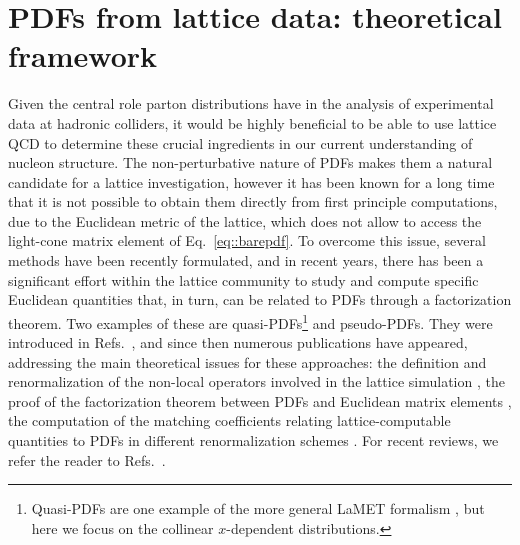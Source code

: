 \chapter{PDFs from lattice data: theoretical framework}
\label{ch:scalar_model}
 
Given the central role parton distributions have in the analysis
of experimental data at hadronic colliders, it would be highly beneficial to be
able to use lattice QCD to determine these crucial ingredients in our current
understanding of nucleon structure.
The non-perturbative nature of PDFs makes them a natural candidate for a lattice investigation,
however it has been known for a long time that it is not possible to
obtain them directly from first principle computations, due to the Euclidean metric of the
lattice, which does not allow to access the light-cone matrix element of Eq.~\eqref{eq::barepdf}.
To overcome this issue, several methods have been recently formulated, 
and in recent years, there has been a significant effort within the lattice
community to study and compute specific Euclidean quantities that, in turn, can be related to PDFs
through a factorization theorem.
%
Two examples of these are quasi-PDFs\footnote{Quasi-PDFs are one example of the more general LaMET formalism \cite{Ji:2014gla,Ji:2020ect}, 
but here we focus on the collinear $x$-dependent distributions.} and pseudo-PDFs.
They were introduced in
Refs.~\cite{PhysRevLett.110.262002, Radyushkin:2017cyf}, and since then numerous
publications have appeared, addressing the main theoretical issues for these
approaches: the definition and renormalization of
the non-local operators involved in the lattice simulation
\cite{Ji:2015jwa,Ishikawa:2016znu,Constantinou:2017sej,Alexandrou:2017huk,Ji:2017rah,Ji:2017oey,Ishikawa:2017faj,Green:2017xeu,Radyushkin:2018nbf,Zhang:2018diq,Li:2018tpe}, 
the proof of the factorization theorem between PDFs and Euclidean matrix elements
\cite{Xiong:2013bka,Ji:2014gla,Ma:2014jla,Briceno:2017cpo,Ma:2017pxb,Izubuchi:2018srq}, the computation of the
matching coefficients relating lattice-computable quantities to PDFs in different renormalization schemes
\cite{Xiong:2013bka,Ma:2014jla,Ji:2015qla,Xiong:2015nua,Ma:2017pxb,Wang:2017qyg,Stewart:2017tvs,Izubuchi:2018srq,Alexandrou:2018pbm,Alexandrou:2018eet,Liu:2018uuj,Liu:2018hxv}.  
For recent reviews, we refer the reader to
Refs.~\cite{DelDebbio:2018siw,Monahan:2018euv,Zhao:2018fyu,Cichy:2018mum,
Radyushkin:2019mye,Ji:2020ect,Lin:2020rut}. 

